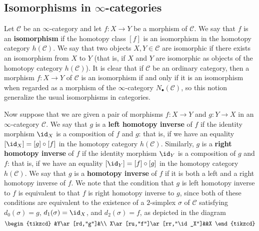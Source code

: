 \subsection{Isomorphisms in \texorpdfstring{$\infty$}{inf}-categories}
Let $\mathcal{C}$ be an $\infty$-category and let $f:X\to Y$ be a morphism of $\mathcal{C}$. We say that $f$ is an \textbf{isomorphism} if the homotopy class $[f]$ is an isomorphism in the homotopy category $h(\mathcal{C})$. We say that two objects $X,Y\in\mathcal{C}$ are isomorphic if there exists an isomorphism from $X$ to $Y$ (that is, if $X$ and $Y$ are isomorphic as objects of the homotopy category $h(\mathcal{C})$). It is clear that if $\mathcal{C}$ be an ordinary category, then a morphism $f:X\to Y$ of $\mathcal{C}$ is an isomorphism if and only if it is an isomorphism when regarded as a morphism of the $\infty$-category $N_\bullet(\mathcal{C})$, so this notion generalize the usual isomorphisms in categories.\par
Now suppose that we are given a pair of morphisms $f:X\to Y$ and $g:Y\to X$ in an $\infty$-category $\mathcal{C}$. We say that $g$ is a \textbf{left homotopy inverse} of $f$ if the identity morphism $\id_X$ is a composition of $f$ and $g$: that is, if we have an equality $[\id_X]=[g]\circ[f]$ in the homotopy category $h(\mathcal{C})$. Similarly, $g$ is a \textbf{right homotopy inverse} of $f$ if the identity morphism $\id_Y$ is a composition of $g$ and $f$: that is, if we have an equality $[\id_Y]=[f]\circ[g]$ in the homotopy category $h(\mathcal{C})$. We say that $g$ is a \textbf{homotopy inverse} of $f$ if it is both a left and a right homotopy inverse of $f$. We note that the condition that $g$ is left homotopy inverse to $f$ is equivalent to that $f$ is right homotopy inverse to $g$, since both of these conditions are equivalent to the existence of a $2$-simplex $\sigma$ of $\mathcal{C}$ satisfying $d_0(\sigma)=g$, $d_1(\sigma)=\id_X$, and $d_2(\sigma)=f$, as depicted in the diagram
\[\begin{tikzcd}
&Y\ar[rd,"g"]&\\
X\ar[ru,"f"]\ar[rr,"\id_X"]&&X
\end{tikzcd}\]

